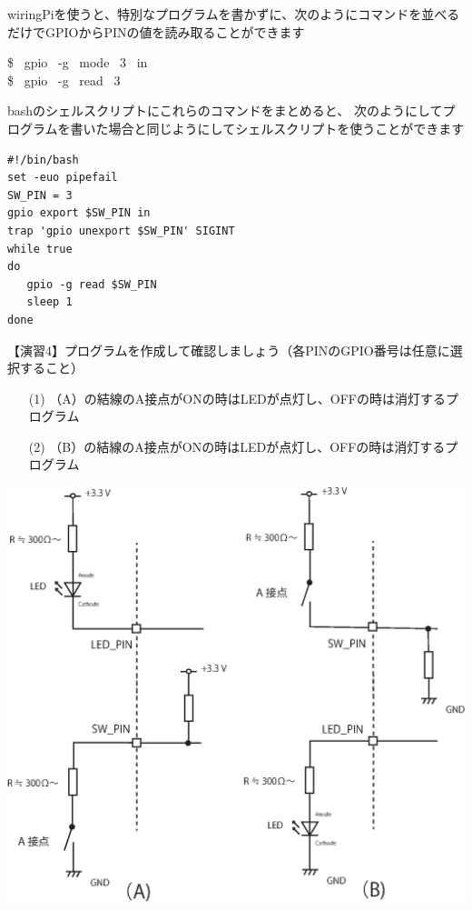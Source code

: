 \documentclass[uplatex,a4paper,11pt,oneside,openany]{jsbook}
\begin{document}
wiringPiを使うと、特別なプログラムを書かずに、次のようにコマンドを並べるだけでGPIOからPINの値を読み取ることができます

\begin{screen}
\$ \, gpio \, -g \, mode \, 3 \, in\\
\$ \, gpio \, -g \, read \, 3
\end{screen}

bashのシェルスクリプトにこれらのコマンドをまとめると、
次のようにしてプログラムを書いた場合と同じようにしてシェルスクリプトを使うことができます\\

\begin{lstlisting}[caption=SW(shell),label=prog1]
#!/bin/bash
set -euo pipefail
SW_PIN = 3
gpio export $SW_PIN in
trap 'gpio unexport $SW_PIN' SIGINT
while true
do
   gpio -g read $SW_PIN
   sleep 1
done
\end{lstlisting}

【演習4】プログラムを作成して確認しましょう（各PINのGPIO番号は任意に選択すること）

\begin{enumerate}
\item[(1)] （A）の結線のA接点がONの時はLEDが点灯し、OFFの時は消灯するプログラム
\item[(2)] （B）の結線のA接点がONの時はLEDが点灯し、OFFの時は消灯するプログラム
\end{enumerate}

\begin{minipage}{0.90\hsize}
      \centering
      \includegraphics[keepaspectratio, scale=0.7, angle=0]
                      {figures/eps/ledsw.eps}
                      \label{fig:LED}
\end{minipage}
\end{document}
